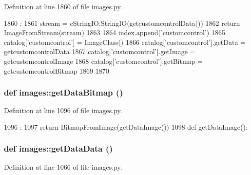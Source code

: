 Definition at line 1860 of file images.py.


\begin{DoxyCode}
1860                            :
1861     stream = cStringIO.StringIO(getcustomcontrolData())
1862     return ImageFromStream(stream)
1863 
1864 index.append('customcontrol')
1865 catalog['customcontrol'] = ImageClass()
1866 catalog['customcontrol'].getData = getcustomcontrolData
1867 catalog['customcontrol'].getImage = getcustomcontrolImage
1868 catalog['customcontrol'].getBitmap = getcustomcontrolBitmap
1869 
1870 

\end{DoxyCode}
\hypertarget{namespaceimages_abecf299bad6e0ab162fbfc417b04fe01}{
\subsubsection[{getDataBitmap}]{\setlength{\rightskip}{0pt plus 5cm}def images::getDataBitmap ()}}
\label{namespaceimages_abecf299bad6e0ab162fbfc417b04fe01}


Definition at line 1096 of file images.py.


\begin{DoxyCode}
1096                    :
1097     return BitmapFromImage(getDataImage())
1098 
def getDataImage():
\end{DoxyCode}
\hypertarget{namespaceimages_a80e3b05a03298099fa80dc089e70f9a1}{
\subsubsection[{getDataData}]{\setlength{\rightskip}{0pt plus 5cm}def images::getDataData ()}}
\label{namespaceimages_a80e3b05a03298099fa80dc089e70f9a1}


Definition at line 1066 of file images.py.


